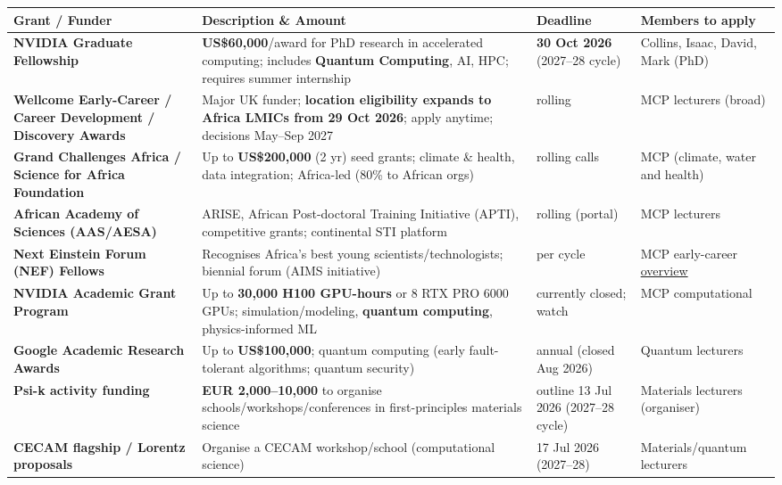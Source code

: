\documentclass[11pt,a4paper]{article}
\begin{document}
\begin{longtable}{@{}p{3.3cm}p{5.6cm}p{2.2cm}p{2.8cm}@{}}
\toprule
\textbf{Grant / Funder} & \textbf{Description \& Amount} & \textbf{Deadline} & \textbf{Members to apply} \\
\midrule
\endhead
\textbf{NVIDIA Graduate Fellowship} & \textbf{US\$60{,}000}/award for PhD research in accelerated computing; includes \textbf{Quantum Computing}, AI, HPC; requires summer internship & \textbf{30 Oct 2026} (2027--28 cycle) & Collins, Isaac, David, Mark (PhD) \\
\midrule
\textbf{Wellcome Early-Career / Career Development / Discovery Awards} & Major UK funder; \textbf{location eligibility expands to Africa LMICs from 29 Oct 2026}; apply anytime; decisions May--Sep 2027 & rolling & MCP lecturers (broad) \\
\midrule
\textbf{Grand Challenges Africa / Science for Africa Foundation} & Up to \textbf{US\$200{,}000} (2 yr) seed grants; climate \& health, data integration; Africa-led (80\% to African orgs) & rolling calls & MCP (climate, water and health) \\
\midrule
\textbf{African Academy of Sciences (AAS/AESA)} & ARISE, African Post-doctoral Training Initiative (APTI), competitive grants; continental STI platform & rolling (portal) & MCP lecturers \\
\midrule
\textbf{Next Einstein Forum (NEF) Fellows} & Recognises Africa's best young scientists/technologists; biennial forum (AIMS initiative) & per cycle & MCP early-career \href{https://en.wikipedia.org/wiki/Next_Einstein_Forum}{overview} \\
\midrule
\textbf{NVIDIA Academic Grant Program} & Up to \textbf{30{,}000 H100 GPU-hours} or 8 RTX PRO 6000 GPUs; simulation/modeling, \textbf{quantum computing}, physics-informed ML & currently closed; watch & MCP computational \\
\midrule
\textbf{Google Academic Research Awards} & Up to \textbf{US\$100{,}000}; quantum computing (early fault-tolerant algorithms; quantum security) & annual (closed Aug 2026) & Quantum lecturers \\
\midrule
\textbf{Psi-k activity funding} & \textbf{EUR 2{,}000--10{,}000} to organise schools/workshops/conferences in first-principles materials science & outline 13 Jul 2026 (2027--28 cycle) & Materials lecturers (organiser) \\
\midrule
\textbf{CECAM flagship / Lorentz proposals} & Organise a CECAM workshop/school (computational science) & 17 Jul 2026 (2027--28) & Materials/quantum lecturers \\
\bottomrule
\end{longtable}
\end{document}
